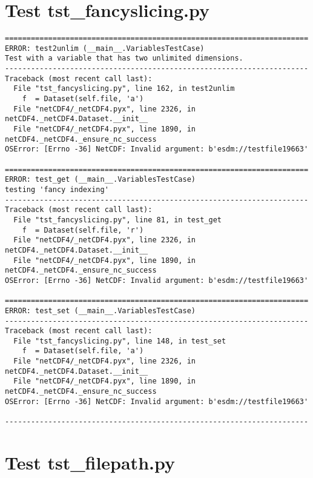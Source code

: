 \section{Test tst\_fancyslicing.py}

\begin{verbatim}
======================================================================
ERROR: test2unlim (__main__.VariablesTestCase)
Test with a variable that has two unlimited dimensions.
----------------------------------------------------------------------
Traceback (most recent call last):
  File "tst_fancyslicing.py", line 162, in test2unlim
    f  = Dataset(self.file, 'a')
  File "netCDF4/_netCDF4.pyx", line 2326, in netCDF4._netCDF4.Dataset.__init__
  File "netCDF4/_netCDF4.pyx", line 1890, in netCDF4._netCDF4._ensure_nc_success
OSError: [Errno -36] NetCDF: Invalid argument: b'esdm://testfile19663'

======================================================================
ERROR: test_get (__main__.VariablesTestCase)
testing 'fancy indexing'
----------------------------------------------------------------------
Traceback (most recent call last):
  File "tst_fancyslicing.py", line 81, in test_get
    f  = Dataset(self.file, 'r')
  File "netCDF4/_netCDF4.pyx", line 2326, in netCDF4._netCDF4.Dataset.__init__
  File "netCDF4/_netCDF4.pyx", line 1890, in netCDF4._netCDF4._ensure_nc_success
OSError: [Errno -36] NetCDF: Invalid argument: b'esdm://testfile19663'

======================================================================
ERROR: test_set (__main__.VariablesTestCase)
----------------------------------------------------------------------
Traceback (most recent call last):
  File "tst_fancyslicing.py", line 148, in test_set
    f  = Dataset(self.file, 'a')
  File "netCDF4/_netCDF4.pyx", line 2326, in netCDF4._netCDF4.Dataset.__init__
  File "netCDF4/_netCDF4.pyx", line 1890, in netCDF4._netCDF4._ensure_nc_success
OSError: [Errno -36] NetCDF: Invalid argument: b'esdm://testfile19663'

----------------------------------------------------------------------
\end{verbatim}

\section{Test tst\_filepath.py}

